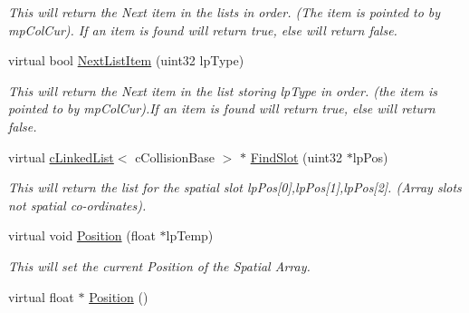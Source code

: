\begin{DoxyCompactItemize}
\begin{DoxyCompactList}\small\item\em This will return the Next item in the lists in order. (The item is pointed to by mpColCur). If an item is found will return true, else will return false. \end{DoxyCompactList}\item 
\hypertarget{classc_collision_handler_a58b636db8343b7f4bbb27f3a93799e8b}{
virtual bool \hyperlink{classc_collision_handler_a58b636db8343b7f4bbb27f3a93799e8b}{NextListItem} (uint32 lpType)}
\label{classc_collision_handler_a58b636db8343b7f4bbb27f3a93799e8b}

\begin{DoxyCompactList}\small\item\em This will return the Next item in the list storing lpType in order. (the item is pointed to by mpColCur).If an item is found will return true, else will return false. \end{DoxyCompactList}\item 
\hypertarget{classc_collision_handler_a5e685d1812aa4a2f5d52c386d2d8809d}{
virtual \hyperlink{classc_linked_list}{cLinkedList}$<$ cCollisionBase $>$ $\ast$ \hyperlink{classc_collision_handler_a5e685d1812aa4a2f5d52c386d2d8809d}{FindSlot} (uint32 $\ast$lpPos)}
\label{classc_collision_handler_a5e685d1812aa4a2f5d52c386d2d8809d}

\begin{DoxyCompactList}\small\item\em This will return the list for the spatial slot lpPos\mbox{[}0\mbox{]},lpPos\mbox{[}1\mbox{]},lpPos\mbox{[}2\mbox{]}. (Array slots not spatial co-\/ordinates). \end{DoxyCompactList}\item 
\hypertarget{classc_collision_handler_aae512b7a5c7abb7307e7d25f22aa9fd0}{
virtual void \hyperlink{classc_collision_handler_aae512b7a5c7abb7307e7d25f22aa9fd0}{Position} (float $\ast$lpTemp)}
\label{classc_collision_handler_aae512b7a5c7abb7307e7d25f22aa9fd0}

\begin{DoxyCompactList}\small\item\em This will set the current Position of the Spatial Array. \end{DoxyCompactList}\item 
\hypertarget{classc_collision_handler_af02385e0c91e4c73c521e65477efed2c}{
virtual float $\ast$ \hyperlink{classc_collision_handler_af02385e0c91e4c73c521e65477efed2c}{Position} ()}
\label{classc_collision_handler_af02385e0c91e4c73c521e65477efed2c}


\end{DoxyCompactItemize}

